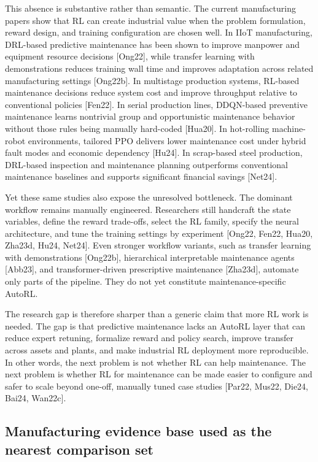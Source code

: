 This absence is substantive rather than semantic. The current manufacturing papers show that RL can create industrial value when the problem formulation, reward design, and training configuration are chosen well. In IIoT manufacturing, DRL-based predictive maintenance has been shown to improve manpower and equipment resource decisions [Ong22], while transfer learning with demonstrations reduces training wall time and improves adaptation across related manufacturing settings [Ong22b]. In multistage production systems, RL-based maintenance decisions reduce system cost and improve throughput relative to conventional policies [Fen22]. In serial production lines, DDQN-based preventive maintenance learns nontrivial group and opportunistic maintenance behavior without those rules being manually hard-coded [Hua20]. In hot-rolling machine-robot environments, tailored PPO delivers lower maintenance cost under hybrid fault modes and economic dependency [Hu24]. In scrap-based steel production, DRL-based inspection and maintenance planning outperforms conventional maintenance baselines and supports significant financial savings [Net24].

Yet these same studies also expose the unresolved bottleneck. The dominant workflow remains manually engineered. Researchers still handcraft the state variables, define the reward trade-offs, select the RL family, specify the neural architecture, and tune the training settings by experiment [Ong22, Fen22, Hua20, Zha23d, Hu24, Net24]. Even stronger workflow variants, such as transfer learning with demonstrations [Ong22b], hierarchical interpretable maintenance agents [Abb23], and transformer-driven prescriptive maintenance [Zha23d], automate only parts of the pipeline. They do not yet constitute maintenance-specific AutoRL.

The research gap is therefore sharper than a generic claim that more RL work is needed. The gap is that predictive maintenance lacks an AutoRL layer that can reduce expert retuning, formalize reward and policy search, improve transfer across assets and plants, and make industrial RL deployment more reproducible. In other words, the next problem is not whether RL can help maintenance. The next problem is whether RL for maintenance can be made easier to configure and safer to scale beyond one-off, manually tuned case studies [Par22, Mus22, Die24, Bai24, Wan22c].

\subsection{Manufacturing evidence base used as the nearest comparison set}

